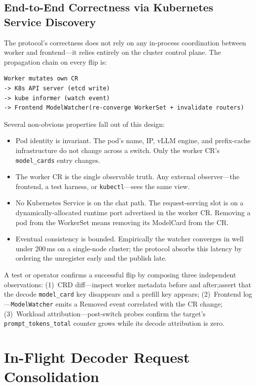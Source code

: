 \documentclass[10pt,twocolumn,letterpaper]{article}
\begin{document}
\subsection{End-to-End Correctness via Kubernetes Service Discovery}
\label{sec:e2e-correctness}

The protocol's correctness does not rely on any in-process coordination between worker and frontend---it relies entirely on the cluster control plane. The propagation chain on every flip is:

\begin{lstlisting}
Worker mutates own CR
-> K8s API server (etcd write)
-> kube informer (watch event)
-> Frontend ModelWatcher(re-converge WorkerSet + invalidate routers)
\end{lstlisting}

Several non-obvious properties fall out of this design:

\begin{itemize}[nosep]
\item Pod identity is invariant. The pod's name, IP, vLLM engine, and prefix-cache infrastructure do not change across a switch. Only the worker CR's \texttt{model\_cards} entry changes.
\item The worker CR is the single observable truth. Any external observer---the frontend, a test harness, or \texttt{kubectl}---sees the same view.
\item No Kubernetes Service is on the chat path. The request-serving slot is on a dynamically-allocated runtime port advertised in the worker CR. Removing a pod from the WorkerSet means removing its ModelCard from the CR.
\item Eventual consistency is bounded. Empirically the watcher converges in well under 200\,ms on a single-node cluster; the protocol absorbs this latency by ordering the unregister early and the publish late.
\end{itemize}

A test or operator confirms a successful flip by composing three independent observations: (1)~CRD diff---inspect worker metadata before and after;assert that the decode \texttt{model\_card} key disappears and a prefill key appears; (2)~Frontend log---\texttt{ModelWatcher} emits a Removed event correlated with the CR change; (3)~Workload attribution---post-switch probes confirm the target's \texttt{prompt\_tokens\_total} counter grows while its decode attribution is zero.

\section{In-Flight Decoder Request Consolidation}
\label{sec:consolidation}
\end{document}

